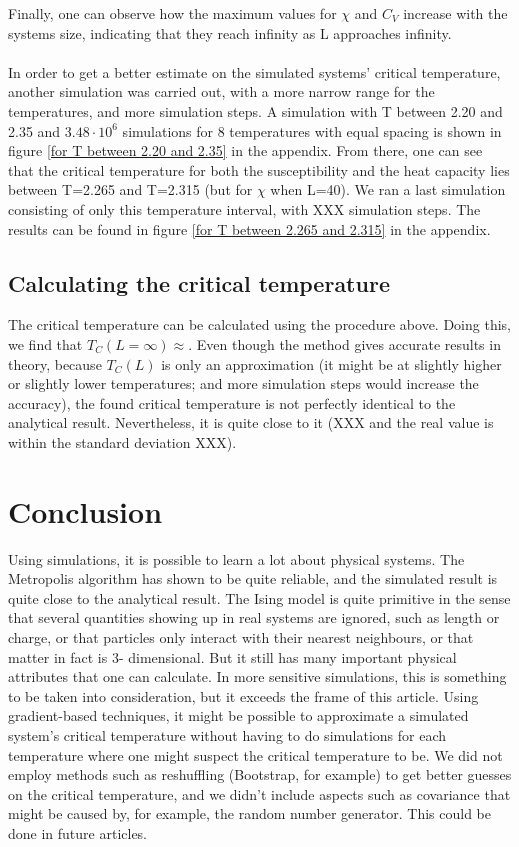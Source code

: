\documentclass[10pt,a4paper]{article}
\begin{document}
Finally, one can observe how the maximum values for $\chi$ and $C_V$ increase with the systems size, indicating that they reach infinity as L approaches infinity.\\\\
In order to get a better estimate on the simulated systems' critical temperature, another simulation was carried out, with a more narrow range for the temperatures, and more simulation steps. A simulation with T between 2.20 and 2.35 and $3.48\cdot10^6$ simulations for 8 temperatures with equal spacing is shown in figure \ref{for T between 2.20 and 2.35} in the appendix. From there, one can see that the critical temperature for both the susceptibility and the heat capacity lies between T=2.265 and T=2.315 (but for $\chi$ when L=40). We ran a last simulation consisting of only this temperature interval, with XXX simulation steps. The results can be found in figure \ref{for T between 2.265 and 2.315} in the appendix.
\subsection{Calculating the critical temperature}
The critical temperature can be calculated using the procedure above. Doing this, we find that $T_C(L=\infty)\approx$. Even though the method gives accurate results in theory, because $T_C(L)$ is only an approximation (it might be at slightly higher or slightly lower temperatures; and more simulation steps would increase the accuracy), the found critical temperature is not perfectly identical to the analytical result. Nevertheless, it is quite close to it (XXX and the real value is within the standard deviation XXX).
\section{Conclusion}
Using simulations, it is possible to learn a lot about physical systems. The Metropolis algorithm has shown to be quite reliable, and the simulated result is quite close to the analytical result. The Ising model is quite primitive in the sense that several quantities showing up in real systems are ignored, such as length or charge, or that particles only interact with their nearest neighbours, or that matter in fact is 3- dimensional. But it still has many important physical attributes that one can calculate. In more sensitive simulations, this is something to be taken into consideration, but it exceeds the frame of this article. Using gradient-based techniques, it might be possible to approximate a simulated system's critical temperature without having to do simulations for each temperature where one might suspect the critical temperature to be. 
We did not employ methods such as reshuffling (Bootstrap, for example) to get better guesses on the critical temperature, and we didn't include aspects such as covariance that might be caused by, for example, the random number generator. This could be done in future articles.
\end{document}
